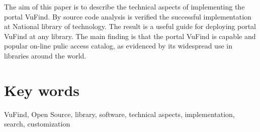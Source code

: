 The aim of this paper is to describe the technical aspects of implementing the portal VuFind. By source code analysis is verified the successful implementation at National library of technology. The result is a useful guide for deploying portal VuFind at any library. The main finding is that the portal VuFind is capable and popular on-line pulic access catalog, as evidenced by its widespread use in libraries around the world.

{\let\clearpage\relax \chapter*{Key words}}

VuFind, Open Source, library, software, technical aspects, implementation, search, customization
